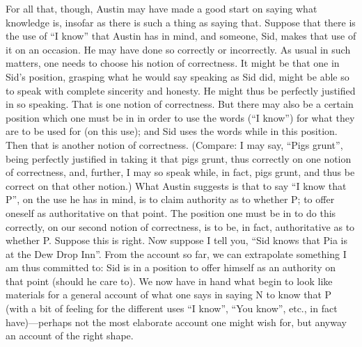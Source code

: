 For all that, though, Austin may have made a good start on saying what knowledge is, insofar as there is such a thing as saying that. Suppose that there is the use of ``I know'' that Austin has in mind, and someone, Sid, makes that use of it on an occasion. He may have done so correctly or incorrectly. As usual in such matters, one needs to choose his notion of correctness. It might be that one in Sid's position, grasping what he would say speaking as Sid did, might be able so to speak with complete sincerity and honesty. He might thus be perfectly justified in so speaking. That is one notion of correctness. But there may also be a certain position which one must be in in order to use the words (``I know'') for what they are to be used for (on this use); and Sid uses the words while in this position. Then that is another notion of correctness. (Compare: I may say, ``Pigs grunt'', being perfectly justified in taking it that pigs grunt, thus correctly on one notion of correctness, and, further, I may so speak while, in fact, pigs grunt, and thus be correct on that other notion.) What Austin suggests is that to say ``I know that P'', on the use he has in mind, is to claim authority as to whether P; to offer oneself as authoritative on that point. The position one must be in to do this correctly, on our second notion of correctness, is to be, in fact, authoritative as to whether P. Suppose this is right. Now suppose I tell you, ``Sid knows that Pia is at the Dew Drop Inn''. From the account so far, we can extrapolate something I am thus committed to: Sid is in a position to offer himself as an authority on that point (should he care to). We now have in hand what begin to look like materials for a general account of what one says in saying N to know that P (with a bit of feeling for the different uses ``I know'', ``You know'', etc., in fact have)---perhaps not the most elaborate account one might wish for, but anyway an account of the right shape.

